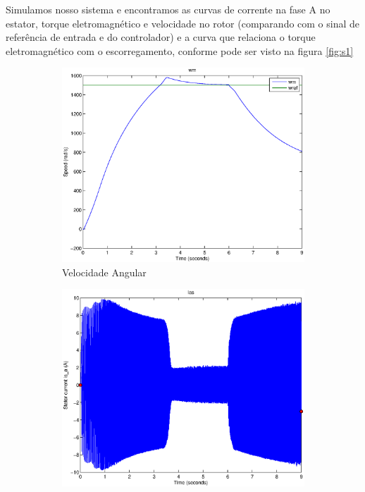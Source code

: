 \documentclass{article}
\begin{document}
Simulamos nosso sistema e encontramos as curvas de corrente na fase A no estator, torque eletromagnético e velocidade no rotor (comparando com o sinal de referência de entrada e do controlador) e a curva que relaciona o torque eletromagnético com o escorregamento, conforme pode ser visto na figura \ref{fig:s1}
\begin{figure}[H]
	\centering
	\begin{subfigure}[b]{0.49\linewidth}
		\includegraphics[width=\linewidth]{matlab/wm}
		\caption{Velocidade Angular}
	\end{subfigure}
	\begin{subfigure}[b]{0.49\linewidth}
		\centering
		\includegraphics[width=\linewidth]{matlab/ias}

\end{subfigure}
\end{figure}
\end{document}
